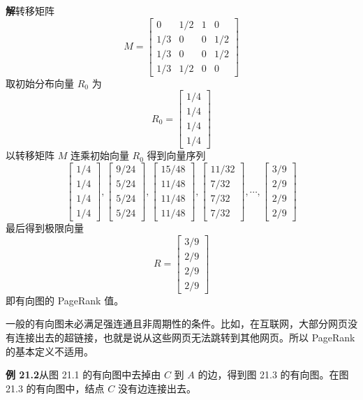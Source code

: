 \documentclass[UTF8,12pt,a4paper,fontset=fandol]{ctexart}
\begin{document}
\noindent\textbf{解}\quad 转移矩阵
\[
M=
\begin{bmatrix}
0 & 1/2 & 1 & 0\\
1/3 & 0 & 0 & 1/2\\
1/3 & 0 & 0 & 1/2\\
1/3 & 1/2 & 0 & 0
\end{bmatrix}
\]
取初始分布向量 $R_0$ 为
\[
R_0=
\begin{bmatrix}
1/4\\
1/4\\
1/4\\
1/4
\end{bmatrix}
\]
以转移矩阵 $M$ 连乘初始向量 $R_0$ 得到向量序列
\[
\begin{bmatrix}
1/4\\
1/4\\
1/4\\
1/4
\end{bmatrix},
\begin{bmatrix}
9/24\\
5/24\\
5/24\\
5/24
\end{bmatrix},
\begin{bmatrix}
15/48\\
11/48\\
11/48\\
11/48
\end{bmatrix},
\begin{bmatrix}
11/32\\
7/32\\
7/32\\
7/32
\end{bmatrix},
\cdots,
\begin{bmatrix}
3/9\\
2/9\\
2/9\\
2/9
\end{bmatrix}
\]
最后得到极限向量
\[
R=
\begin{bmatrix}
3/9\\
2/9\\
2/9\\
2/9
\end{bmatrix}
\]
即有向图的 PageRank 值。

一般的有向图未必满足强连通且非周期性的条件。比如，在互联网，大部分网页没有连接出去的超链接，也就是说从这些网页无法跳转到其他网页。所以 PageRank 的基本定义不适用。

\noindent\textbf{例 21.2}\quad 从图 21.1 的有向图中去掉由 $C$ 到 $A$ 的边，得到图 21.3 的有向图。在图 21.3 的有向图中，结点 $C$ 没有边连接出去。
\end{document}
